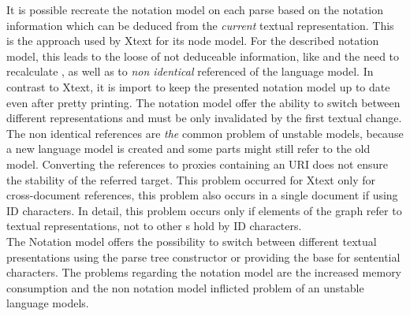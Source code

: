 It is possible recreate the notation model on each parse based on the notation information which can be deduced from the \emph{current} textual representation. This is the approach used by Xtext for its node model. For the described notation model, this leads to the loose of not deduceable information, like  and the need to recalculate , as well as to \emph{non identical} referenced  of the language model. In contrast to Xtext, it is import to keep the presented notation model up to date even after pretty printing. The notation model offer the ability to switch between different representations and must be only invalidated by the first textual change. The non identical references are \emph{the} common problem of unstable models, because a new language model is created and some parts might still refer to the old model. Converting the references to proxies containing an URI does not ensure the stability of the referred target. This problem occurred for Xtext only for cross-document references, this problem also occurs in a single document if using ID characters. In detail, this problem occurs only if elements of the  graph refer to textual representations, not to other s hold by ID characters.\\
The Notation model offers the possibility to switch between different textual presentations using the parse tree constructor or providing the base for sentential characters. The problems regarding the notation model are the increased memory consumption and the non notation model inflicted problem of an unstable language models. 

